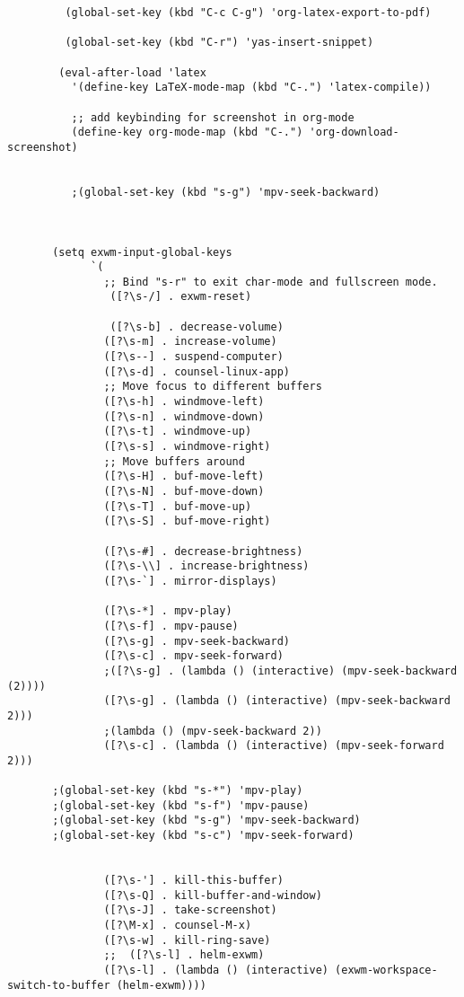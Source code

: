 \documentclass[11pt]{article}
\begin{document}
\begin{verbatim}
         (global-set-key (kbd "C-c C-g") 'org-latex-export-to-pdf)

         (global-set-key (kbd "C-r") 'yas-insert-snippet)

        (eval-after-load 'latex
          '(define-key LaTeX-mode-map (kbd "C-.") 'latex-compile))

          ;; add keybinding for screenshot in org-mode
          (define-key org-mode-map (kbd "C-.") 'org-download-screenshot)


          ;(global-set-key (kbd "s-g") 'mpv-seek-backward)



       (setq exwm-input-global-keys
             `(
               ;; Bind "s-r" to exit char-mode and fullscreen mode.
                ([?\s-/] . exwm-reset)

                ([?\s-b] . decrease-volume)
               ([?\s-m] . increase-volume)
               ([?\s--] . suspend-computer)
               ([?\s-d] . counsel-linux-app)
               ;; Move focus to different buffers
               ([?\s-h] . windmove-left)
               ([?\s-n] . windmove-down)
               ([?\s-t] . windmove-up)
               ([?\s-s] . windmove-right)
               ;; Move buffers around
               ([?\s-H] . buf-move-left)
               ([?\s-N] . buf-move-down)
               ([?\s-T] . buf-move-up)
               ([?\s-S] . buf-move-right)

               ([?\s-#] . decrease-brightness)
               ([?\s-\\] . increase-brightness)
               ([?\s-`] . mirror-displays)

               ([?\s-*] . mpv-play)
               ([?\s-f] . mpv-pause)
               ([?\s-g] . mpv-seek-backward)
               ([?\s-c] . mpv-seek-forward)
               ;([?\s-g] . (lambda () (interactive) (mpv-seek-backward (2))))
               ([?\s-g] . (lambda () (interactive) (mpv-seek-backward 2)))
               ;(lambda () (mpv-seek-backward 2))
               ([?\s-c] . (lambda () (interactive) (mpv-seek-forward 2)))

       ;(global-set-key (kbd "s-*") 'mpv-play)
       ;(global-set-key (kbd "s-f") 'mpv-pause)
       ;(global-set-key (kbd "s-g") 'mpv-seek-backward)
       ;(global-set-key (kbd "s-c") 'mpv-seek-forward)


               ([?\s-'] . kill-this-buffer)
               ([?\s-Q] . kill-buffer-and-window)
               ([?\s-J] . take-screenshot)
               ([?\M-x] . counsel-M-x)
               ([?\s-w] . kill-ring-save)
               ;;  ([?\s-l] . helm-exwm)
               ([?\s-l] . (lambda () (interactive) (exwm-workspace-switch-to-buffer (helm-exwm))))


\end{verbatim}
\end{document}
